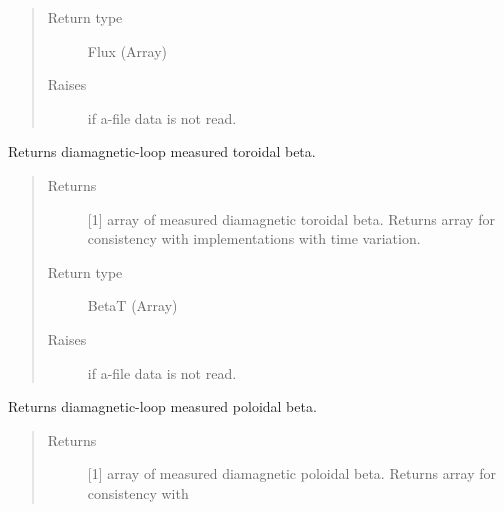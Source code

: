 \documentclass[letterpaper,10pt,english]{sphinxmanual}
\begin{document}
\begin{fulllineitems}
\begin{fulllineitems}
\begin{quote}
\begin{description}
\item[{Return type}] \leavevmode
Flux (Array)

\item[{Raises}] \leavevmode
{} \textendash{} if a-file data is not read.

\end{description}\end{quote}

\end{fulllineitems}


\begin{fulllineitems}
\label{\detokenize{eqtools:eqtools.eqdskreader.EqdskReader.getDiamagBetaT}}
Returns diamagnetic-loop measured toroidal beta.
\begin{quote}\begin{description}
\item[{Returns}] \leavevmode
{[}1{]} array of measured diamagnetic toroidal beta.
Returns array for consistency with
{\hyperref[\detokenize{eqtools:eqtools.core.Equilibrium}]{}}
implementations with time variation.

\item[{Return type}] \leavevmode
BetaT (Array)

\item[{Raises}] \leavevmode
{} \textendash{} if a-file data is not read.

\end{description}\end{quote}

\end{fulllineitems}


\begin{fulllineitems}
\label{\detokenize{eqtools:eqtools.eqdskreader.EqdskReader.getDiamagBetaP}}
Returns diamagnetic-loop measured poloidal beta.
\begin{quote}\begin{description}
\item[{Returns}] \leavevmode
{[}1{]} array of measured diamagnetic poloidal beta.
Returns array for consistency with


\end{description}
\end{quote}
\end{fulllineitems}
\end{fulllineitems}
\end{document}
